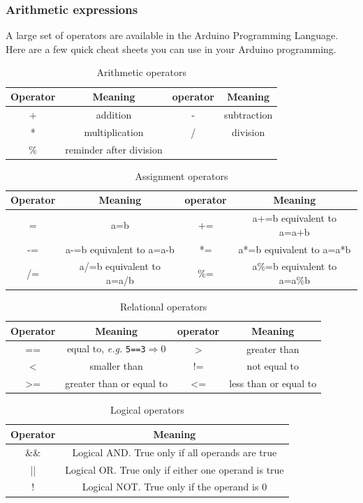 \documentclass{article}
\begin{document}
\subsubsection{Arithmetic expressions}
A large set of operators are available in the Arduino Programming Language. Here are a few quick cheat sheets you can use in your Arduino programming.
\begin{table}[H]
    \centering
    \begin{tabular}{c|c||c|c} \hline
        Operator & Meaning & operator & Meaning\\ \hline
        + & addition & - & subtraction \\
        * & multiplication & / & division \\
        \% & reminder after division & & \\\hline
    \end{tabular}
    \caption{Arithmetic operators}
\end{table}
\begin{table}[H] \vspace{-.5cm}
    \centering
    \begin{tabular}{c|c||c|c} \hline
        Operator & Meaning & operator & Meaning\\ \hline
        = & a=b & += & a+=b equivalent to a=a+b \\
        -= & a-=b equivalent to a=a-b & *= & a*=b equivalent to a=a*b \\
        /= & a/=b equivalent to a=a/b & \%= & a\%=b equivalent to a=a\%b \\\hline
    \end{tabular}
    \caption{Assignment operators}
\end{table}
\begin{table}[H]\vspace{-.5cm}
    \centering
    \begin{tabular}{c|c||c|c} \hline
        Operator & Meaning & operator & Meaning\\ \hline
        == & equal to, 	\textit{e.g.} \texttt{5==3}$\Rightarrow$0 & > & greater than \\
        < & smaller than & != & not equal to \\
        >= & greater than or equal to & <= & less than or equal to \\\hline
    \end{tabular}
    \caption{Relational operators}
\end{table}
\begin{table}[H]\vspace{-.5cm}
    \centering
    \begin{tabular}{c|c} \hline
        Operator & Meaning\\ \hline
        \&\& & Logical AND. True only if all operands are true  \\
        || & Logical OR. True only if either one operand is true \\
        ! & Logical NOT. True only if the operand is 0 \\\hline
    \end{tabular}
    \caption{Logical operators}
\end{table}
\end{document}
